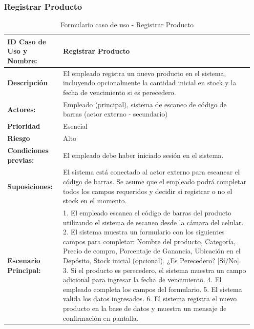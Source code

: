 \documentclass[twoside]{article}
\begin{document}
\subsubsection{Registrar Producto}
\begin{table}[!htbp]
\centering
\caption{Formulario caso de uso - Registrar Producto}
\begin{tabular}{|l|p{29em}|} %
\toprule
\rowcolor[rgb]{ .635, .973, .882} \textbf{ID Caso de Uso y Nombre:} & \cellcolor[rgb]{ .867, .922, .969} Registrar Producto \\
\midrule
\rowcolor[rgb]{ .635, .973, .882} \textbf{Descripción} & \cellcolor[rgb]{ .867, .922, .969} El empleado registra un nuevo producto en el sistema, incluyendo opcionalmente la cantidad inicial en stock y la fecha de vencimiento si es perecedero. \\
\midrule
\rowcolor[rgb]{ .635, .973, .882} \textbf{Actores:} & \cellcolor[rgb]{ .867, .922, .969} Empleado (principal), sistema de escaneo de código de barras (actor externo - secundario) \\
\midrule
\rowcolor[rgb]{ .635, .973, .882} \textbf{Prioridad} & \cellcolor[rgb]{ .867, .922, .969} Esencial \\
\midrule
\rowcolor[rgb]{ .635, .973, .882} \textbf{Riesgo} & \cellcolor[rgb]{ .867, .922, .969} Alto \\
\midrule
\rowcolor[rgb]{ .635, .973, .882} \textbf{Condiciones previas:} & \cellcolor[rgb]{ .867, .922, .969} El empleado debe haber iniciado sesión en el sistema. \\
\midrule
\rowcolor[rgb]{ .635, .973, .882} \textbf{Suposiciones:} & \cellcolor[rgb]{ .867, .922, .969} El sistema está conectado al actor externo para escanear el código de barras. Se asume que el empleado podrá completar todos los campos requeridos y decidir si registrar o no el stock en el momento. \\
\midrule
\rowcolor[rgb]{ .635, .973, .882} \textbf{Escenario Principal:} & \cellcolor[rgb]{ .867, .922, .969} 1. El empleado escanea el código de barras del producto utilizando el sistema de escaneo desde la cámara del celular.\newline{} 2. El sistema muestra un formulario con los siguientes campos para completar: Nombre del producto, Categoría, Precio de compra, Porcentaje de Ganancia, Ubicación en el Depósito, Stock inicial (opcional), ¿Es Perecedero? [Sí/No].\newline{} 3. Si el producto es perecedero, el sistema muestra un campo adicional para ingresar la fecha de vencimiento.\newline{} 4. El empleado completa los campos del formulario.\newline{} 5. El sistema valida los datos ingresados.\newline{} 6. El sistema registra el nuevo producto en la base de datos y muestra un mensaje de confirmación en pantalla. \\

\end{tabular}
\end{table}
\end{document}
